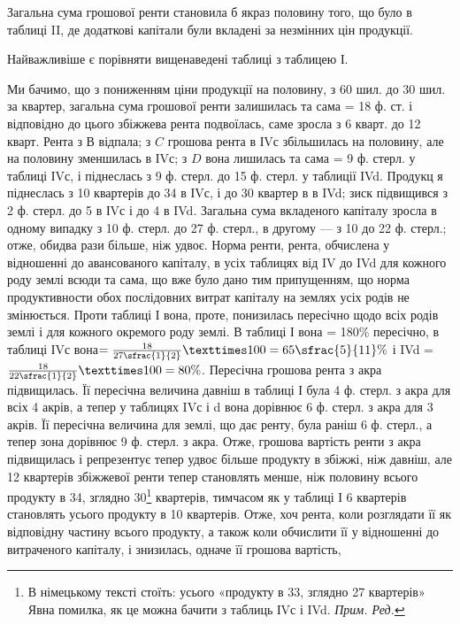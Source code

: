
Загальна сума грошової ренти становила б якраз половину того, що було
в таблиці II, де додаткові капітали були вкладені за незмінних цін продукції.

Найважливіше є порівняти вищенаведені таблиці з таблицею І.

Ми бачимо, що з пониженням ціни продукції на половину, з 60 шил. до
30 шил. за квартер, загальна сума грошової ренти залишилась та сама = 18 ф.
ст. і відповідно до цього збіжжева рента подвоїлась, саме зросла з 6 кварт. до
12 кварт. Рента з $В$ відпала; з $C$ грошова рента в ІVс збільшилась на половину,
але на половину зменшилась в ІVс; з $D$ вона лишилась та сама = 9 ф.
стерл. у таблиці ІVс, і піднеслась з 9 ф. стерл. до 15 ф. стерл. у таблиції ІVd.
Продукц я піднеслась з 10 квартерів до 34 в ІVс, і до 30 квартер в в IVd;
зиск підвищився з 2 ф. стерл. до 5 в ІVс і до 4 в IVd. Загальна сума
вкладеного капіталу зросла в одному випадку з 10 ф. стерл. до 27 ф. стерл.,
в другому — з 10 до 22 ф. стерл.; отже, обидва рази більше, ніж удвоє. Норма
ренти, рента, обчислена у відношенні до авансованого капіталу, в усіх таблицях
від IV до IVd для кожного роду землі всюди та сама, що вже було дано тим припущенням,
що норма продуктивности обох послідовних витрат капіталу на землях
усіх родів не змінюється. Проти таблиці І вона, проте, понизилась пересічно
щодо всіх родів землі і для кожного окремого роду землі. В таблиці І вона =
180\% пересічно, в таблиці ІVс вона$ = \frac{18}{27\sfrac{1}{2}} × 100 = 65\sfrac{5}{11}\%$ і
IVd = $\frac{18}{22\sfrac{1}{2}} × 100 = 80\%$. Пересічна грошова рента з акра підвищилась. Її пересічна
величина давніш в таблиці І була 4 ф. стерл. з акра для всіх 4 акрів,
а тепер у таблицях IVс і d вона дорівнює 6 ф. стерл. з акра для 3 акрів.
Її пересічна величина для землі, що дає ренту, була раніш 6 ф. стерл., а тепер
зона дорівнює 9 ф. стерл. з акра. Отже, грошова вартість ренти з акра підвищилась
і репрезентує тепер удвоє більше продукту в збіжжі, ніж давніш, але
12 квартерів збіжжевої ренти тепер становлять менше, ніж половину всього продукту
в 34, зглядно 30\footnote*{В німецькому тексті стоїть: усього «продукту в 33, зглядно 27 квартерів» Явна помилка,
як це можна бачити з таблиць ІVс і IVd. \emph{Прим. Ред.}} квартерів, тимчасом як у таблиці І 6 квартерів становлять
  усього продукту в 10 квартерів. Отже, хоч рента, коли розглядати
її як відповідну частину всього продукту, а також коли обчислити її у відношенні
до витраченого капіталу, і знизилась, одначе її грошова вартість,
